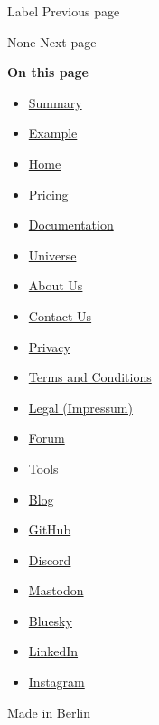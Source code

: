 { Label } { Previous page }

\href{/docs/reference/foundations/none/}{\pandocbounded{}}

{ None } { Next page }

\textbf{On this page}

\begin{itemize}
\tightlist
\item
  \hyperref[summary]{Summary}
\item
  \hyperref[example]{Example}
\end{itemize}

\begin{itemize}
\tightlist
\item
  \href{/}{Home}
\item
  \href{/pricing/}{Pricing}
\item
  \href{/docs/}{Documentation}
\item
  \href{/universe/}{Universe}
\item
  \href{/about/}{About Us}
\item
  \href{/contact/}{Contact Us}
\item
  \href{/privacy/}{Privacy}
\item
  \href{https://typst.app/terms}{Terms and Conditions}
\item
  \href{/legal/}{Legal (Impressum)}
\end{itemize}

\begin{itemize}
\tightlist
\item
  \href{https://forum.typst.app}{Forum}
\item
  \href{/tools/}{Tools}
\item
  \href{/blog/}{Blog}
\item
  \href{https://github.com/typst/}{GitHub}
\item
  \href{https://discord.gg/2uDybryKPe}{Discord}
\item
  \href{https://mastodon.social/@typst}{Mastodon}
\item
  \href{https://bsky.app/profile/typst.app}{Bluesky}
\item
  \href{https://www.linkedin.com/company/typst/}{LinkedIn}
\item
  \href{https://instagram.com/typstapp/}{Instagram}
\end{itemize}

Made in Berlin
